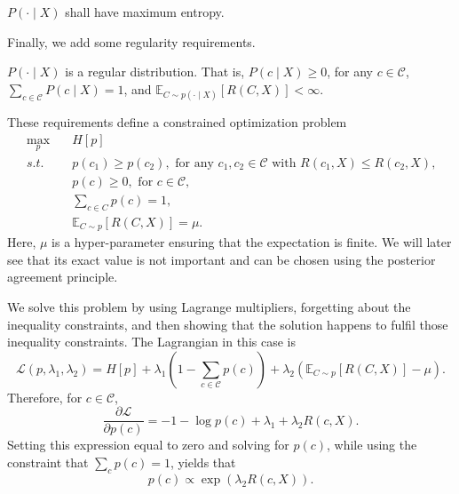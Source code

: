 \begin{requirement}
$P(\cdot \mid X)$ shall have maximum entropy.
\end{requirement}

Finally, we add some regularity requirements.

\begin{requirement}
$P(\cdot \mid X)$ is a regular distribution. That is, $P(c \mid X) \geq 0$, for any $c \in \mathcal{C}$, $\sum_{c \in \mathcal{C}} P(c \mid X) = 1$, and $\mathbb{E}_{C \sim p(\cdot \mid X)}[R(C, X)] < \infty$.
\end{requirement}

These requirements define a constrained optimization problem
%
\begin{align}
\max_{p} \quad& H[p]\label{eq:max_ent_gibbs}\\
s.t. \quad& p(c_1) \geq p(c_2), \text{ for any $c_1, c_2 \in \mathcal{C}$ with $R(c_1, X) \leq R(c_2, X)$,}\label{req:max_ent_mono}\\
& p(c) \geq 0, \text{ for $c \in \mathcal{C}$,}\label{req:max_ent_nonneg}\\
& \sum_{c \in C} p(c) = 1, \label{req:max_ent_massone}\\
& \mathbb{E}_{C \sim p}[R(C, X)] = \mu. \label{req:max_ent_fixexp}
\end{align}
%
Here, $\mu$ is a hyper-parameter ensuring that the expectation is finite. We will later see that its exact value is not important and can be chosen using the posterior agreement principle.

We solve this problem by using Lagrange multipliers, forgetting about the inequality constraints, and then showing that the solution happens to fulfil those inequality constraints. The Lagrangian in this case is
%
\begin{equation}
\mathcal{L}(p, \lambda_1, \lambda_2) = H[p] + \lambda_1 \left( 1- \sum_{c \in \mathcal{C}} p(c)\right) + \lambda_2 \left(\mathbb{E}_{C \sim p}[R(C, X)] - \mu\right).
\label{eq:max_ent_lag}
\end{equation}
%
Therefore, for $c \in \mathcal{C}$,
%
\begin{equation}
\frac{\partial \mathcal{L}}{\partial p(c)} = -1 -\log p(c) + \lambda_1 + \lambda_2 R(c, X).
\end{equation}
%
Setting this expression equal to zero and solving for $p(c)$, while using the constraint that $\sum_c p(c) = 1$, yields that
%
\begin{equation}
p(c) \propto \exp(\lambda_2 R(c, X)).
\end{equation}

